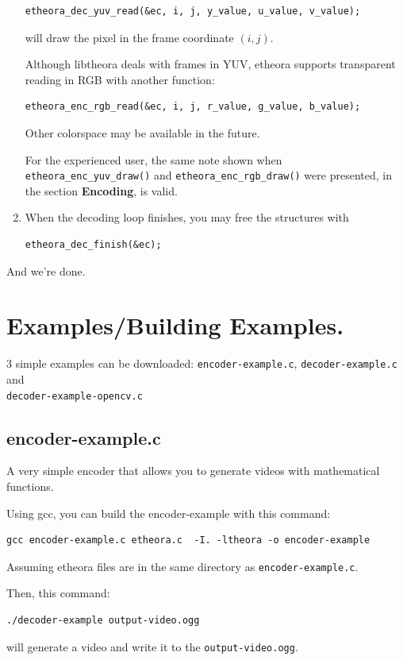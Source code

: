 \documentclass{article}
\begin{document}
\begin{enumerate}
\begin{verbatim}
etheora_dec_yuv_read(&ec, i, j, y_value, u_value, v_value);
\end{verbatim}
will draw the pixel in the frame coordinate $(i,j)$. 

Although libtheora deals with frames in YUV, etheora supports 
transparent reading in RGB with another function: 
\begin{verbatim}
etheora_enc_rgb_read(&ec, i, j, r_value, g_value, b_value);
\end{verbatim}
Other colorspace may be available in the future. 

For the experienced user, the same note shown when 
\texttt{etheora\_enc\_yuv\_draw()} and 
\texttt{etheora\_enc\_rgb\_draw()} 
were presented, in the section \textbf{Encoding}, is valid. 

\item When the decoding loop finishes, you may free the structures
with 
\begin{verbatim}
etheora_dec_finish(&ec);
\end{verbatim}

\end{enumerate}

And we're done. 


\section{Examples/Building Examples.}

$3$ simple examples can be downloaded: \texttt{encoder-example.c},
\texttt{decoder-example.c} and \\ \texttt{decoder-example-opencv.c}

\subsection{encoder-example.c}

A very simple encoder that allows you to generate videos with
mathematical functions. 

Using gcc, you can build the encoder-example with this command: 
\begin{verbatim}
gcc encoder-example.c etheora.c  -I. -ltheora -o encoder-example  
\end{verbatim}
Assuming etheora files are in the same directory as 
\texttt{encoder-example.c}. 

Then, this command:
\begin{verbatim}
./decoder-example output-video.ogg  
\end{verbatim}
will generate a video and write it to the \texttt{output-video.ogg}. 
\end{document}
